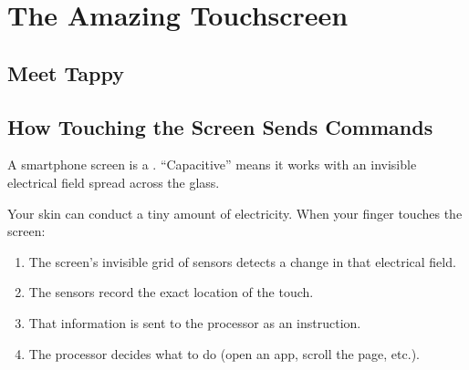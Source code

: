 
\chapter{The Amazing Touchscreen}


\section*{Meet Tappy}


\sectionrule

\section*{How Touching the Screen Sends Commands}

A smartphone screen is a .
``Capacitive'' means it works with an invisible electrical field spread across the glass.

Your skin can conduct a tiny amount of electricity.
When your finger touches the screen:

\begin{enumerate}[label=\textbf{\arabic*.}]
  \item The screen's invisible grid of sensors detects a change in that electrical field.
  \item The sensors record the exact location of the touch.
  \item That information is sent to the processor as an instruction.
  \item The processor decides what to do (open an app, scroll the page, etc.).
\end{enumerate}

